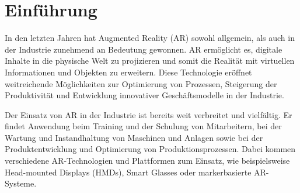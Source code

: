 \section{Einführung}

In den letzten Jahren hat Augmented Reality (AR) sowohl allgemein, als auch in
der Industrie zunehmend an Bedeutung gewonnen. AR ermöglicht es, digitale
Inhalte in die physische Welt zu projizieren und somit die Realität mit
virtuellen Informationen und Objekten zu erweitern. Diese Technologie eröffnet
weitreichende Möglichkeiten zur Optimierung von Prozessen, Steigerung der
Produktivität und Entwicklung innovativer Geschäftsmodelle in der Industrie.

Der Einsatz von AR in der Industrie ist bereits weit verbreitet und vielfältig.
Er findet Anwendung beim Training und der Schulung von Mitarbeitern, bei der
Wartung und Instandhaltung von Maschinen und Anlagen sowie bei der
Produktentwicklung und Optimierung von Produktionsprozessen. Dabei kommen
verschiedene AR-Technologien und Plattformen zum Einsatz, wie beispielsweise
Head-mounted Displays (HMDs), Smart Glasses oder markerbasierte AR-Systeme.